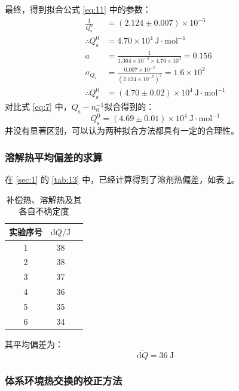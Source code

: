 \documentclass[cn,hazy,pku,12pt,normal,math=newtx,cite=super]{elegantnote}
\begin{document}
最终，得到拟合公式 \eqref{eq:11} 中的参数：
\begin{align*}
    \frac{1}{Q_{\mathrm{s}}^0} &= (2.124 \pm 0.007 )\times 10^{-5}  \\
    \therefore Q_{\mathrm{s}}^0 &= 4.70 \times 10^4 \mathrm{~J\cdot mol^{-1}}\\
    a &= \frac{1}{1.364\times 10^{-4}\times 4.70 \times 10^4} = 0.156 \\
    \sigma_{Q_{\mathrm{s}}} &= \frac{0.007\times 10^{-5}}{(2.124\times 10^{-5})^2} = 1.6\times 10^2\\
    \therefore  Q_{\mathrm{s}}^0 &= (4.70 \pm 0.02)\times 10^4 \mathrm{~J\cdot mol^{-1}}
\end{align*}
对比式 \eqref{eq:7} 中，$Q_{\mathrm{s}}-n_0^{-1}$拟合得到的：
\begin{equation}
     Q_{\mathrm{s}}^0 = (4.69 \pm 0.01)\times 10^4 \mathrm{~J\cdot mol^{-1}}
\end{equation}
并没有显著区别，可以认为两种拟合方法都具有一定的合理性。
\subsubsection{溶解热平均偏差的求算}

在 \ref{sec:1} 的 \ref{tab:13} 中，已经计算得到了溶剂热偏差，如表 \ref{tab:17}。

\begin{table}[htbp]
    \centering
    \caption{补偿热、溶解热及其各自不确定度}
    \begin{tabular}{ccc}
        \toprule
        实验序号 & $\mathrm{d}Q/\mathrm{J}$ \\
        \midrule
        1 & 38 \\
        2 & 38 \\
        3 & 37 \\
        4 & 36 \\
        5 & 35 \\
        6 & 34 \\
        \bottomrule
    \end{tabular}
    \label{tab:17}
\end{table}

其平均偏差为：
\begin{equation*}
    \overline{\mathrm{d}Q} = 36\mathrm{~J}
\end{equation*}

\subsubsection{体系环境热交换的校正方法}
\end{document}
